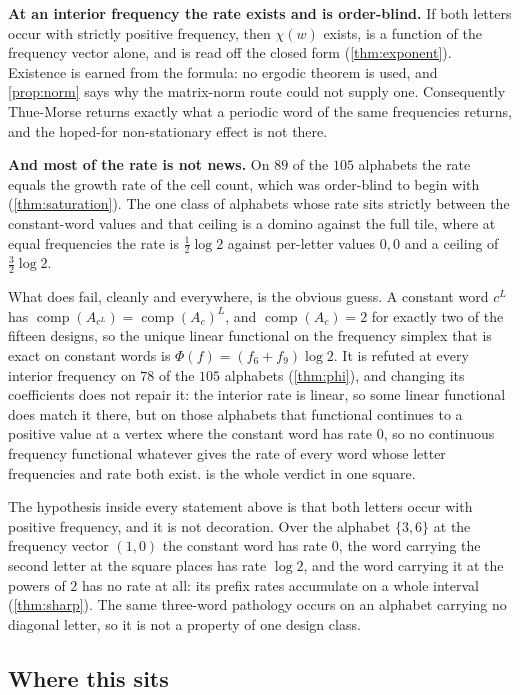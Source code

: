\documentclass[11pt]{amsart}
\theoremstyle{definition}
\theoremstyle{remark}
\DeclareMathOperator{\comp}{comp}
\begin{document}
\medskip
\noindent\textbf{At an interior frequency the rate exists and is order-blind.} If both letters occur with strictly positive frequency, then $\chi(w)$ exists, is a function of the frequency vector alone, and is read off the closed form (\cref{thm:exponent}). Existence is earned from the formula: no ergodic theorem is used, and \cref{prop:norm} says why the matrix-norm route could not supply one. Consequently Thue-Morse returns exactly what a periodic word of the same frequencies returns, and the hoped-for non-stationary effect is not there.

\medskip
\noindent\textbf{And most of the rate is not news.} On $89$ of the $105$ alphabets the rate equals the growth rate of the cell count, which was order-blind to begin with (\cref{thm:saturation}). The one class of alphabets whose rate sits strictly between the constant-word values and that ceiling is a domino against the full tile, where at equal frequencies the rate is $\tfrac12 \log 2$ against per-letter values $0, 0$ and a ceiling of $\tfrac32 \log 2$.

What does fail, cleanly and everywhere, is the obvious guess. A constant word $c^L$ has $\comp(A_{c^L}) = \comp(A_c)^L$, and $\comp(A_c) = 2$ for exactly two of the fifteen designs, so the unique linear functional on the frequency simplex that is exact on constant words is $\Phi(f) = (f_6 + f_9)\log 2$. It is refuted at every interior frequency on $78$ of the $105$ alphabets (\cref{thm:phi}), and changing its coefficients does not repair it: the interior rate is linear, so some linear functional does match it there, but on those alphabets that functional continues to a positive value at a vertex where the constant word has rate $0$, so no continuous frequency functional whatever gives the rate of every word whose letter frequencies and rate both exist.  is the whole verdict in one square.

The hypothesis inside every statement above is that both letters occur with positive frequency, and it is not decoration. Over the alphabet $\{3, 6\}$ at the frequency vector $(1,0)$ the constant word has rate $0$, the word carrying the second letter at the square places has rate $\log 2$, and the word carrying it at the powers of $2$ has no rate at all: its prefix rates accumulate on a whole interval (\cref{thm:sharp}). The same three-word pathology occurs on an alphabet carrying no diagonal letter, so it is not a property of one design class.

\subsection*{Where this sits}
\end{document}
